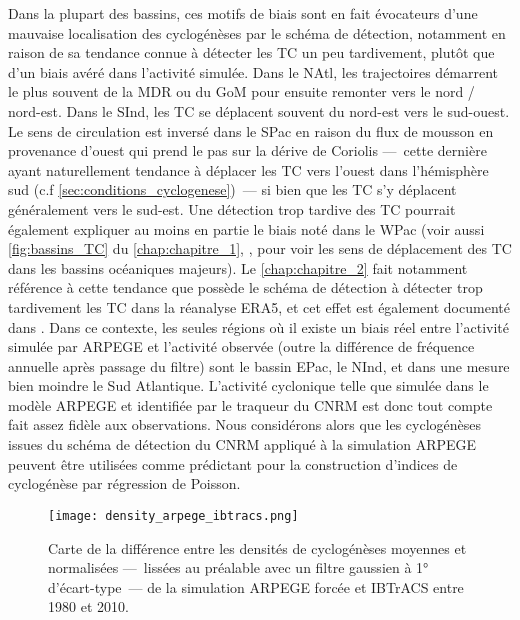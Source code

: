 \documentclass[../main.tex]{subfiles}
\begin{document}
Dans la plupart des bassins, ces motifs de biais sont en fait évocateurs d'une mauvaise localisation des cyclogénèses par le schéma de détection, notamment en
raison de sa tendance connue à détecter les TC un peu tardivement, plutôt que d'un biais avéré dans l'activité simulée. Dans le NAtl, les trajectoires démarrent
le plus souvent de la MDR ou du GoM pour ensuite remonter vers le nord / nord-est. Dans le SInd, les TC se déplacent souvent du nord-est vers le sud-ouest. Le
sens de circulation est inversé dans le SPac en raison du flux de mousson en provenance d'ouest qui prend le pas sur la dérive de Coriolis ---~cette dernière
ayant naturellement tendance à déplacer les TC vers l'ouest dans l'hémisphère sud (c.f \cref{sec:conditions_cyclogenese})~--- si bien que les TC s'y déplacent
généralement vers le sud-est. Une détection trop tardive des TC pourrait également expliquer au moins en partie le biais noté dans le WPac (voir aussi
\cref{fig:bassins_TC} du \cref{chap:chapitre_1}, , pour voir les sens de déplacement des TC dans les bassins océaniques majeurs). Le
\cref{chap:chapitre_2} fait notamment référence à cette tendance que possède le schéma de détection à détecter trop tardivement les TC dans la réanalyse ERA5,
et cet effet est également documenté dans \textcite{bourdin_intercomparison_2022}. Dans ce contexte, les seules régions où il existe un biais réel entre
l'activité simulée par ARPEGE et l'activité observée (outre la différence de fréquence annuelle après passage du filtre) sont le bassin EPac, le NInd, et dans
une mesure bien moindre le Sud Atlantique. L'activité cyclonique telle que simulée dans le modèle ARPEGE et identifiée par le traqueur du CNRM est donc tout
compte fait assez fidèle aux observations. Nous considérons alors que les cyclogénèses issues du schéma de détection du CNRM appliqué à la simulation ARPEGE
peuvent être utilisées comme prédictant pour la construction d'indices de cyclogénèse par régression de Poisson.

\begin{figure}[tb]
    \centering
    \texttt{[image: density\_arpege\_ibtracs.png]}
    \caption{Carte de la différence entre les densités de cyclogénèses moyennes et normalisées ---~lissées au préalable avec un filtre gaussien à \ang{1}
    d'écart-type~--- de la simulation ARPEGE forcée et IBTrACS entre \num{1980} et \num{2010}.}
    \label{fig:density_arpege_ibtracs}
\end{figure}
\end{document}
